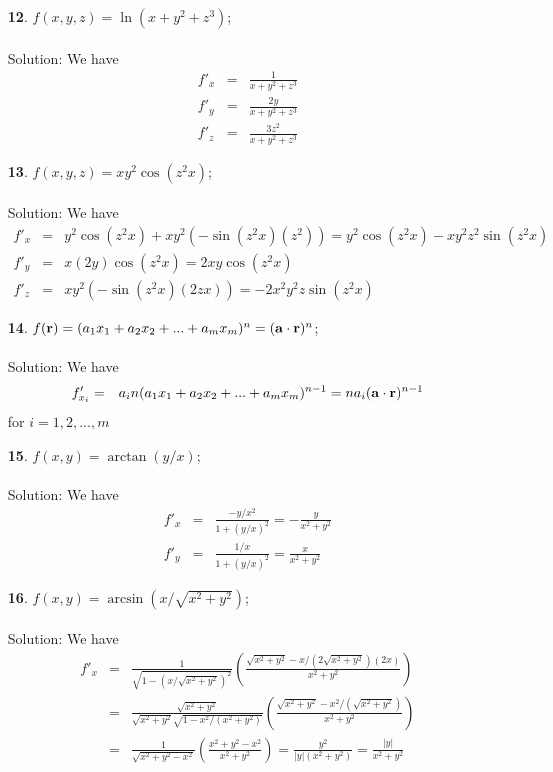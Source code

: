 \documentclass[12pt]{amsbook}
\begin{document}
\begin{enumerate}
\item[{\small\bf 12}.] $f(x,y,z)=\ln(x+y^2+z^3)$;
\\
\\
{\sc Solution}: We have
\begin{eqnarray*}
f'_x&=&\frac{1}{x+y^2+z^3} \\
f'_y&=&\frac{2y}{x+y^2+z^3} \\
f'_z&=&\frac{3z^2}{x+y^2+z^3}
\end{eqnarray*}
\item[{\small\bf 13}.] $f(x,y,z)=xy^2\cos(z^2x)$;
\\
\\
{\sc Solution}: We have
\begin{eqnarray*}
f'_x&=&y^2\cos(z^2x)+xy^2(-\sin(z^2x)(z^2))=y^2\cos(z^2x)-xy^2z^2\sin(z^2x) \\
f'_y&=&x(2y)\cos(z^2x)=2xy\cos(z^2x) \\
f'_z&=&xy^2(-\sin(z^2x)(2zx))=-2x^2y^2z\sin(z^2x)
\end{eqnarray*}
\item[{\small\bf 14}.] $f({\bf r})=(a_1x_1+a_2x_2+...+a_mx_m)^n=({\bf a}\cdot{\bf r})^n$;
\\
\\
{\sc Solution}: We have
\begin{eqnarray*}
f'_{x_i}&=&a_in(a_1x_1+a_2x_2+...+a_mx_m)^{n-1}=na_i({\bf a}\cdot{\bf r})^{n-1}
\end{eqnarray*}
for $i=1,2,...,m$
\item[{\small\bf 15}.] $f(x,y)=\arctan(y/x)$;
\\
\\
{\sc Solution}: We have
\begin{eqnarray*}
f'_x&=& \frac{-y/x^2}{1+(y/x)^2}=-\frac{y}{x^2+y^2} \\
f'_y&=& \frac{1/x}{1+(y/x)^2}=\frac{x}{x^2+y^2}
\end{eqnarray*}
\item[{\small\bf 16}.] $f(x,y)=\arcsin(x/\sqrt{x^2+y^2})$;
\\
\\
{\sc Solution}: We have
\begin{eqnarray*}
f'_x&=& \frac{1}{\sqrt{1-(x/\sqrt{x^2+y^2})^2}}(\frac{\sqrt{x^2+y^2}-x/(2\sqrt{x^2+y^2})(2x)}{x^2+y^2}) \\
&=& \frac{\sqrt{x^2+y^2}}{\sqrt{x^2+y^2}\sqrt{1-x^2/(x^2+y^2)}}(\frac{\sqrt{x^2+y^2}-x^2/(\sqrt{x^2+y^2})}{x^2+y^2}) \\
&=& \frac{1}{\sqrt{x^2+y^2-x^2}}(\frac{x^2+y^2-x^2}{x^2+y^2})=\frac{y^2}{|y|(x^2+y^2)}=\frac{|y|}{x^2+y^2} \\

\end{eqnarray*}
\end{enumerate}
\end{document}
